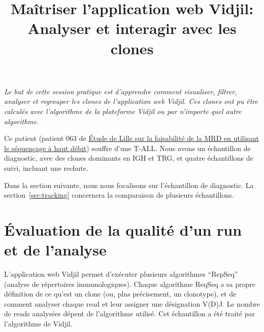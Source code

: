 \documentclass[10pt]{article}
\title{Maîtriser l'application web Vidjil:\\ Analyser et interagir avec les  clones
}
\begin{document}
\maketitle

  \textit{Le but de cette session pratique est d'apprendre comment
  visualiser, filtrer, analyser et regrouper les clones de l'application web
  Vidjil. %
Ces clones ont pu être calculés avec l'algorithme de la plateforme Vidjil ou par n'importe
quel autre algorithme.}

\bigskip


Ce patient (patient 063 de \href{https://doi.org/10.1016/j.leukres.2016.11.009}{Étude de Lille sur la faisabilité de la MRD en utilisant le séquençage à haut débit})
souffre d'une T-ALL. Nous avons un échantillon de diagnostic,
avec des clones dominants en IGH et TRG,
et quatre échantillons de suivi, incluant une rechute.


Dans la section suivante, nous nous focalisons sur l'échantillon de diagnostic.
La section~\ref{sec:tracking} concernera la comparaison de plusieurs échantillons.



\section{Évaluation de la qualité d'un run et de l'analyse}
L'application web Vidjil permet d'exécuter plusieurs algorithmes ``RepSeq'' (analyse de répertoires immunologiques).
Chaque algorithme ReqSeq a sa propre définition de ce qu'est un clone
(ou, plus précisement, un clonotype),
et de comment analyser chaque read et leur assigner une désignation V(D)J.
Le nombre de reads analysées dépent de l'algorithme utilisé.
Cet échantillon a été traité par l'algorithme de Vidjil.


\end{document}

